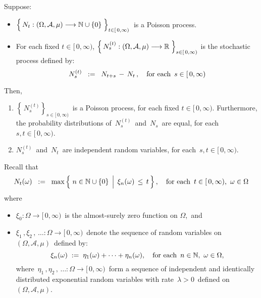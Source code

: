 
\vskip 0.5cm
\begin{theorem}\label{TimeTranslatedPoissonProcessIsItselfPoissonProcess}
\mbox{}
\vskip 0.15cm
\noindent
Suppose:
\begin{itemize}
\item
	$\left\{\,N_{t} : (\Omega,\mathcal{A},\mu) \overset{{\color{white}-}}{\longrightarrow} \N\cup\{0\} \;\right\}_{t \in [\,0,\infty)}$\,
	is a Poisson process.
\item
	For each fixed $t \in [\,0,\infty)$,
	$\left\{\,N^{(t)}_{s} : (\Omega,\mathcal{A},\mu) \overset{{\color{white}-}}{\longrightarrow} \Re \;\right\}_{s \in [\,0,\infty)}$\;
	is the stochastic process defined by:
	\begin{equation*}
	N^{(t)}_{s} \;\; := \;\; N_{t+s} \,-\, N_{t}\,,
	\quad
	\textnormal{for each \,$s \in [\,0,\infty)$}
	\end{equation*}
\end{itemize}
Then,
\begin{enumerate}
\item
	$\left\{\,N^{(t)}_{s}\right\}_{s \in [\,0,\infty)}$\, is a Poisson process, for each fixed $t \in [\,0,\infty)$.
	Furthermore, the probability distributions of \,$N^{(t)}_{s}$\, and \,$N_{s}$\, are equal,
	for each \,$s, t \in [\,0,\infty)$.
\item
	$N^{(t)}_{s}$\, and \,$N_{t}$\, are independent random variables, for each \,$s, t \in [\,0,\infty)$.
\end{enumerate}
\end{theorem}
\proof
Recall that
\begin{equation*}
N_{t}(\omega)
\;\; := \;\;
	\max\left\{\,\left.
		n \overset{{\color{white}.}}{\in} \N\cup\{0\}
		\,\;\right\vert\;
		\xi_{n}(\omega) \,\leq\, t
		\,\right\},
\quad
\textnormal{for each \,$t \in [\,0,\infty)$,\, $\omega \in \Omega$}
\end{equation*}
where
\begin{itemize}
\item
	$\xi_{0} : \Omega \longrightarrow [\,0,\infty)$\, is the almost-surely zero function on $\Omega$,\,
and
\item
	$\xi_{1}\,, \xi_{2}\,, \,\ldots : \Omega \longrightarrow [\,0,\infty)$\,
	denote the sequence of random variables on
	\,$(\Omega,\mathcal{A},\mu)$\, defined by:
	\begin{equation*}
	\xi_{n}(\omega) \; := \; \eta_{1}(\omega) + \cdots + \eta_{n}(\omega),
	\quad
	\textnormal{for each \,$n \in \mathbb{N}$,\, $\omega \in \Omega$},
	\end{equation*}
	where
	\,$\eta_{1}\,, \eta_{2}\,, \,\ldots : \Omega \longrightarrow [\,0,\infty)$\,
	form a sequence of independent and identically distributed
	exponential random variables with rate \,$\lambda > 0$\,
	defined on \,$(\Omega,\mathcal{A},\mu)$.
\end{itemize}
